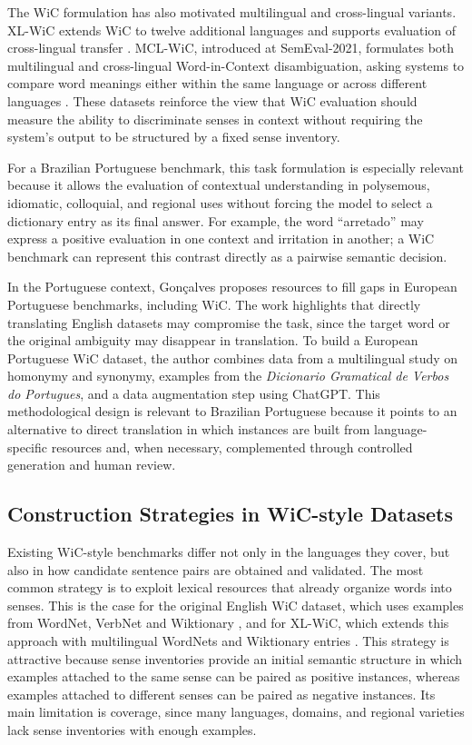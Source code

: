 \documentclass[10pt,a4paper,twocolumn]{article}
\begin{document}
The WiC formulation has also motivated multilingual and cross-lingual variants. XL-WiC extends WiC to twelve additional languages and supports evaluation of cross-lingual transfer \citep{rahnama2020xlwic}. MCL-WiC, introduced at SemEval-2021, formulates both multilingual and cross-lingual Word-in-Context disambiguation, asking systems to compare word meanings either within the same language or across different languages \citep{martelli2021mclwic}. These datasets reinforce the view that WiC evaluation should measure the ability to discriminate senses in context without requiring the system's output to be structured by a fixed sense inventory.

For a Brazilian Portuguese benchmark, this task formulation is especially relevant because it allows the evaluation of contextual understanding in polysemous, idiomatic, colloquial, and regional uses without forcing the model to select a dictionary entry as its final answer. For example, the word \enquote{arretado} may express a positive evaluation in one context and irritation in another; a WiC benchmark can represent this contrast directly as a pairwise semantic decision.

In the Portuguese context, Gon{\c{c}}alves \citep{goncalves2024filling} proposes resources to fill gaps in European Portuguese benchmarks, including WiC. The work highlights that directly translating English datasets may compromise the task, since the target word or the original ambiguity may disappear in translation. To build a European Portuguese WiC dataset, the author combines data from a multilingual study on homonymy and synonymy, examples from the \textit{Dicionario Gramatical de Verbos do Portugues}, and a data augmentation step using ChatGPT. This methodological design is relevant to Brazilian Portuguese because it points to an alternative to direct translation in which instances are built from language-specific resources and, when necessary, complemented through controlled generation and human review.

\subsection{Construction Strategies in WiC-style Datasets}
\label{subsec:methods-creation}

Existing WiC-style benchmarks differ not only in the languages they cover, but also in how candidate sentence pairs are obtained and validated. The most common strategy is to exploit lexical resources that already organize words into senses. This is the case for the original English WiC dataset, which uses examples from WordNet, VerbNet and Wiktionary \citep{pilehvar2019wic}, and for XL-WiC, which extends this approach with multilingual WordNets and Wiktionary entries \citep{rahnama2020xlwic}. This strategy is attractive because sense inventories provide an initial semantic structure in which examples attached to the same sense can be paired as positive instances, whereas examples attached to different senses can be paired as negative instances. Its main limitation is coverage, since many languages, domains, and regional varieties lack sense inventories with enough examples.
\end{document}
